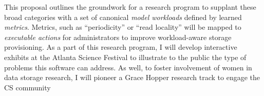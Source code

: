 
This proposal outlines the groundwork for a research program to supplant these
broad categories with a set of canonical \textit{model workloads} defined by learned
\textit{metrics}.  Metrics, such as ``periodicity'' or ``read locality'' will be
mapped to \textit{executable actions} for administrators to improve workload-aware
storage provisioning. As a part of this research program, I will develop interactive exhibits at the Atlanta Science Festival to illustrate to the public the type of problems this software can address. As well, to foster involvement of women in data storage research, I will pioneer a Grace Hopper research track to engage the CS community %
 


